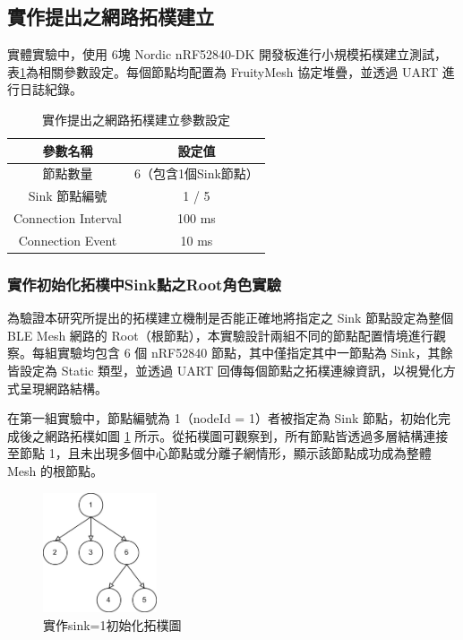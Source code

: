 \begin{ZhChapter}
\subsection{實作提出之網路拓樸建立}
實體實驗中，使用 6塊 Nordic nRF52840-DK 開發板進行小規模拓樸建立測試，表\ref{tab: 實作提出之網路拓樸建立參數設定}為相關參數設定。每個節點均配置為 FruityMesh 協定堆疊，並透過 UART 進行日誌紀錄。

\begin{table}[H]
    \centering
    \caption{實作提出之網路拓樸建立參數設定}
    \label{tab: 實作提出之網路拓樸建立參數設定}
    \begin{tabular}{|c|c|}
        \hline
        參數名稱 & 設定值 \\
        \hline
        節點數量 & 6（包含1個Sink節點） \\
        \hline
        Sink 節點編號 & 1 / 5 \\
        \hline
        Connection Interval & 100 ms \\
        \hline
        Connection Event & 10 ms \\
        \hline
    \end{tabular}
\end{table}

\subsubsection{實作初始化拓樸中Sink點之Root角色實驗}
為驗證本研究所提出的拓樸建立機制是否能正確地將指定之 Sink 節點設定為整個 BLE Mesh 網路的 Root（根節點），本實驗設計兩組不同的節點配置情境進行觀察。每組實驗均包含 6 個 nRF52840 節點，其中僅指定其中一節點為 Sink，其餘皆設定為 Static 類型，並透過 UART 回傳每個節點之拓樸連線資訊，以視覺化方式呈現網路結構。

在第一組實驗中，節點編號為 1（nodeId = 1）者被指定為 Sink 節點，初始化完成後之網路拓樸如圖 \ref{fig: 實作sink=1初始化拓樸圖} 所示。從拓樸圖可觀察到，所有節點皆透過多層結構連接至節點 1，且未出現多個中心節點或分離子網情形，顯示該節點成功成為整體 Mesh 的根節點。

\begin{figure}[H]
    \centering
    \includegraphics[width = 0.3\textwidth]{image/實作sink=1初始化拓樸圖.jpg}
    \caption{實作sink=1初始化拓樸圖}
    \label{fig: 實作sink=1初始化拓樸圖}
\end{figure}


\end{ZhChapter}
